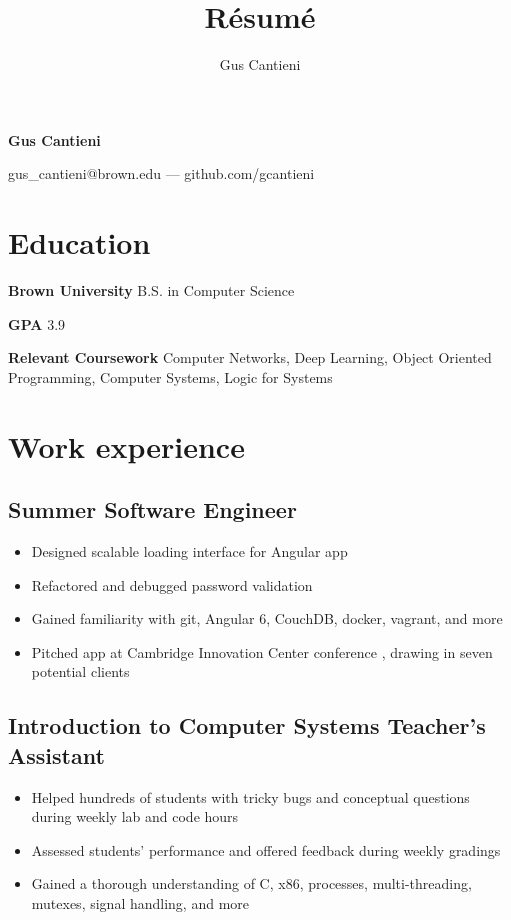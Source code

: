 \documentclass[11pt]{article}
\title{R\'esum\'e}
\author{Gus Cantieni}
\makeatletter
\renewcommand{\maketitle}{
	\begin{center}
		{\huge\bfseries Gus Cantieni}
		\vspace{0.25em}

		gus\_cantieni@brown.edu --- github.com/gcantieni

	\end{center}
}
\makeatother
\begin{document}
\maketitle
\section{Education}
\begin{minipage}{20em}
	\textbf{Brown University} B.S. in Computer Science

	\textbf{GPA} 3.9

\end{minipage}
\begin{minipage}{25em}

	\textbf{Relevant Coursework} Computer Networks, Deep Learning, Object Oriented Programming, Computer Systems, Logic for Systems
\end{minipage}

\section{Work experience}
\subsection{Summer Software Engineer}
\begin{itemize}
	\item Designed scalable loading interface for Angular app 
	\item Refactored and debugged password validation 
	\item Gained familiarity with git, Angular 6, CouchDB, docker, vagrant, and more
	\item Pitched app at Cambridge Innovation Center conference , drawing in seven potential clients
\end{itemize}
\subsection{Introduction to Computer Systems Teacher's Assistant
}
\begin{itemize}
	\item Helped hundreds of students with tricky bugs and conceptual questions during weekly lab and code hours
	\item Assessed students' performance and offered feedback during weekly gradings
	\item Gained a thorough understanding of C, x86, processes, multi-threading, mutexes, signal handling, and more 
\end{itemize}
\end{document}
